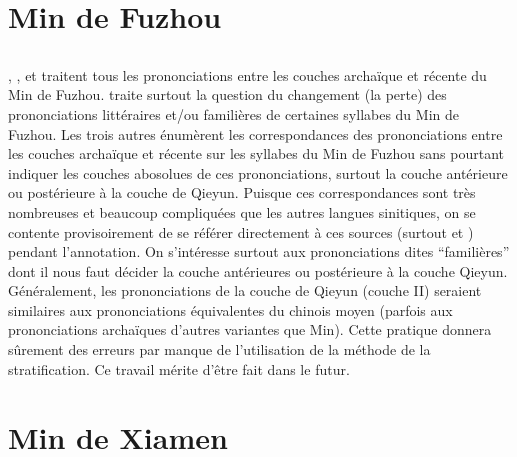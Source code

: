 \documentclass{scrbook}
\newcounter{c}[subsubsection]
\newcommand{\difwenbai}{couches archaïque et récente\xspace}
\newcommand{\diflaoxin}{sociolectes âgé et jeune\xspace}
\newcommand{\iso}{syllabes isolées\xspace}
\begin{document}
\begin{sloppypar}
\section{Min de Fuzhou}
\subsection{\MakeCapital{\difwenbai}}
\textcite{Lin1985fuzhou}, \textcite{Liang1985fuzhou}, \textcite{Wang1989fuzhou} et \textcite[66--71]{Chen1998fuzhou} traitent tous les prononciations entre les \difwenbai du Min de Fuzhou. \textcite{Wang1989fuzhou} traite surtout la question du changement (la perte) des prononciations littéraires et/ou familières de certaines syllabes du Min de Fuzhou. Les trois autres énumèrent les correspondances des prononciations entre les \difwenbai sur les syllabes du Min de Fuzhou sans pourtant indiquer les couches abosolues de ces prononciations, surtout la couche antérieure ou postérieure à la couche de Qieyun. Puisque ces correspondances sont très nombreuses et beaucoup compliquées que les autres langues sinitiques, on se contente provisoirement de se référer directement à ces sources (surtout \cite{Lin1985fuzhou} et \cite{Liang1985fuzhou}) pendant l'annotation. On s'intéresse surtout aux prononciations dites ``familières'' dont il nous faut décider la couche antérieures ou postérieure à la couche Qieyun. Généralement, les prononciations de la couche de Qieyun (couche II) seraient similaires aux prononciations équivalentes du chinois moyen (parfois aux prononciations archaïques d'autres variantes que Min). Cette pratique donnera sûrement des erreurs par manque de l'utilisation de la méthode de la stratification. Ce travail mérite d'être fait dans le futur.


\section{Min de Xiamen}

\end{sloppypar}
\end{document}
